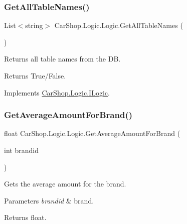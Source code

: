\subsubsection{\texorpdfstring{Get\+All\+Table\+Names()}{GetAllTableNames()}}
{\footnotesize\ttfamily List$<$string$>$ Car\+Shop.\+Logic.\+Logic.\+Get\+All\+Table\+Names (\begin{DoxyParamCaption}{ }\end{DoxyParamCaption})}



Returns all table names from the DB. 

\begin{DoxyReturn}{Returns}
True/\+False.
\end{DoxyReturn}


Implements \mbox{\hyperlink{interface_car_shop_1_1_logic_1_1_i_logic_aee2a118a9a867dbc77901298cf112e02}{Car\+Shop.\+Logic.\+I\+Logic}}.

\mbox{\label{class_car_shop_1_1_logic_1_1_logic_a267a602b668e129bdf2aba4ce1ea30ed}} 
\subsubsection{\texorpdfstring{Get\+Average\+Amount\+For\+Brand()}{GetAverageAmountForBrand()}}
{\footnotesize\ttfamily float Car\+Shop.\+Logic.\+Logic.\+Get\+Average\+Amount\+For\+Brand (\begin{DoxyParamCaption}\item[{int}]{brandid }\end{DoxyParamCaption})}



Gets the average amount for the brand. 


\begin{DoxyParams}{Parameters}
{\em brandid} & brand.\\
\hline
\end{DoxyParams}
\begin{DoxyReturn}{Returns}
float.
\end{DoxyReturn}
\mbox{\label{class_car_shop_1_1_logic_1_1_logic_a9bf3e72677516747e386faf557a0e105}} 
